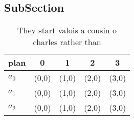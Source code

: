\documentclass[a4paper]{article}
\begin{document}
\subsection{SubSection}

\begin{table}
\begin{adjustbox}{width=0.9\columnwidth}
\begin{tabular}{|l|l|l|l|l|}
\hline
\textbf{plan} & \multicolumn{1}{c|}{\textbf{0}} & \multicolumn{1}{c|}{\textbf{1}} & \multicolumn{1}{c|}{\textbf{2}} & \multicolumn{1}{c|}{\textbf{3}} \\ \hline
\textbf{$a_0$}  & (0,0) & (1,0) & (2,0) & (3,0) \\ \hline
\textbf{$a_1$}  & (0,0) & (1,0) & (2,0) & (3,0) \\ \hline
\textbf{$a_2$}  & (0,0) & (1,0) & (2,0) & (3,0) \\ \hline
\end{tabular}
\end{adjustbox}
\caption{They start valois a cousin o charles rather than 
}
\end{table}
\end{document}
